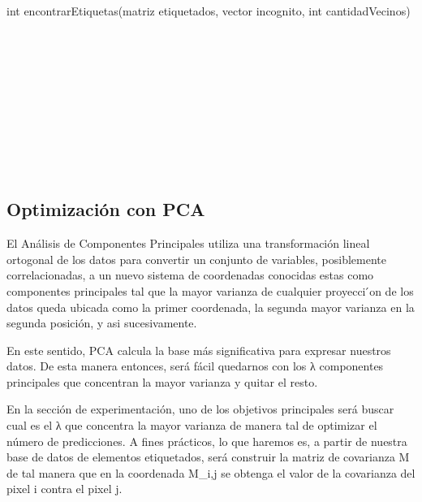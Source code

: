 \begin{algorithm}
    \begin{algorithmic}[1]\parskip=2mm
        \caption{int encontrarEtiquetas(matriz etiquetados, vector incognito, int cantidadVecinos)}
        \\
        \\
        \\
        \\
        \\
        \\
        \\
        \\
        \\
    \end{algorithmic}
\end{algorithm}


\subsection {Optimización con PCA}


El Análisis de Componentes Principales utiliza una transformación lineal ortogonal de los datos para convertir un conjunto de variables, posiblemente correlacionadas, a un nuevo sistema de coordenadas conocidas estas como componentes principales tal que la mayor varianza de cualquier proyecci ́on de los datos queda ubicada como la primer coordenada, la segunda mayor varianza en la segunda posición, y asi sucesivamente. 

En este sentido, PCA calcula la base más significativa para expresar nuestros datos.
De esta manera entonces, será fácil quedarnos con los λ componentes principales que concentran la mayor varianza y quitar el resto. 

En la sección de experimentación, uno de los objetivos principales será buscar cual es el λ que concentra la mayor varianza de manera tal de optimizar el número de predicciones. A fines prácticos, lo que haremos es, a partir de nuestra base de datos de elementos etiquetados, será construir la matriz de covarianza M de tal manera que en la coordenada M_{i,j} se obtenga el valor de la covarianza del pixel i contra el pixel j. 

